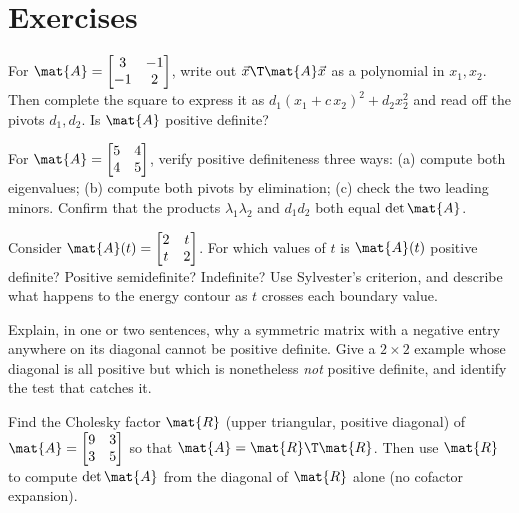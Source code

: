 \section{Exercises}

\begin{exercise}
\label{ch27:ex-warmup}
For $\mat{A} = \begin{bmatrix} 3 & -1 \\ -1 & 2 \end{bmatrix}$, write out $\vec{x}\T\mat{A}\vec{x}$ as
a polynomial in $x_1, x_2$. Then complete the square to express it as $d_1(x_1 + c\,x_2)^2 + d_2
x_2^2$ and read off the pivots $d_1, d_2$. Is $\mat{A}$ positive definite?
\end{exercise}

\begin{exercise}
\label{ch27:ex-threetests}
For $\mat{A} = \begin{bmatrix} 5 & 4 \\ 4 & 5 \end{bmatrix}$, verify positive definiteness three
ways: (a) compute both eigenvalues; (b) compute both pivots by elimination; (c) check the two
leading minors. Confirm that the products $\lambda_1\lambda_2$ and $d_1 d_2$ both equal $\det\mat{A}$.
\end{exercise}

\begin{exercise}
\label{ch27:ex-boundary}
Consider $\mat{A}(t) = \begin{bmatrix} 2 & t \\ t & 2 \end{bmatrix}$. For which values of $t$ is
$\mat{A}(t)$ positive definite? Positive semidefinite? Indefinite? Use Sylvester's criterion, and
describe what happens to the energy contour as $t$ crosses each boundary value.
\end{exercise}

\begin{exercise}
\label{ch27:ex-diag}
Explain, in one or two sentences, why a symmetric matrix with a negative entry anywhere on its
diagonal cannot be positive definite. Give a $2\times2$ example whose diagonal is all positive but
which is nonetheless \emph{not} positive definite, and identify the test that catches it.
\end{exercise}

\begin{exercise}
\label{ch27:ex-chol}
Find the Cholesky factor $\mat{R}$ (upper triangular, positive diagonal) of
$\mat{A} = \begin{bmatrix} 9 & 3 \\ 3 & 5 \end{bmatrix}$ so that $\mat{A}=\mat{R}\T\mat{R}$. Then use
$\mat{R}$ to compute $\det\mat{A}$ from the diagonal of $\mat{R}$ alone (no cofactor expansion).
\end{exercise}

